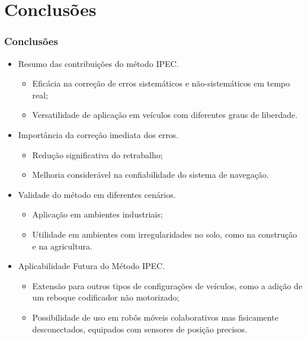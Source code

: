 \documentclass[xcolor=dvipsnames, aspectratio=169]{beamer}
\begin{document}
\section{Conclusões}
\begin{frame}
  \frametitle{Conclusões}
  \begin{itemize}
    \item Resumo das contribuições do método IPEC.
      \begin{itemize}
        \item Eficácia na correção de erros sistemáticos e não-sistemáticos em tempo real;
        \item Versatilidade de aplicação em veículos com diferentes graus de liberdade.
      \end{itemize}
    \item Importância da correção imediata dos erros.
      \begin{itemize}
        \item Redução significativa do retrabalho;
        \item Melhoria considerável na confiabilidade do sistema de navegação.
      \end{itemize}
    \item Validade do método em diferentes cenários.
      \begin{itemize}
        \item Aplicação em ambientes industriais;
        \item Utilidade em ambientes com irregularidades no solo, como na construção e na agricultura.
      \end{itemize}
    \item Aplicabilidade Futura do Método IPEC.
      \begin{itemize}
        \item Extensão para outros tipos de configurações de veículos, como a adição de um reboque codificador não motorizado;
        \item Possibilidade de uso em robôs móveis colaborativos mas fisicamente desconectados, equipados com sensores de posição precisos.
      \end{itemize}
      

\end{itemize}
\end{frame}
\end{document}

